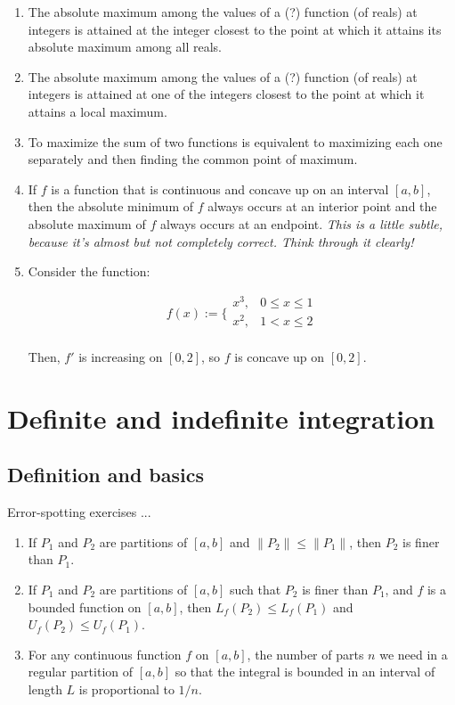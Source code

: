 \documentclass[10pt]{amsart}
\begin{document}
\begin{enumerate}
\item The absolute maximum among the values of a (?) function (of reals)
  at integers is attained at the integer closest to the point at which
  it attains its absolute maximum among all reals.
\item The absolute maximum among the values of a (?) function (of reals)
  at integers is attained at one of the integers closest to the point
  at which it attains a local maximum.
\item To maximize the sum of two functions is equivalent to maximizing
  each one separately and then finding the common point of maximum.
\item If $f$ is a function that is continuous and concave up on an
  interval $[a,b]$, then the absolute minimum of $f$ always occurs at
  an interior point and the absolute maximum of $f$ always occurs at
  an endpoint. {\em This is a little subtle, because it's almost but
  not completely correct. Think through it clearly!}
\item Consider the function:

  $$f(x) := \lbrace\begin{array}{rl} x^3, & 0 \le x \le 1 \\ x^2, & 1 < x \le 2 \\\end{array}$$

  Then, $f'$ is increasing on $[0,2]$, so $f$ is concave up on
  $[0,2]$.
\end{enumerate}

\section{Definite and indefinite integration}

\subsection{Definition and basics}

Error-spotting exercises ...

\begin{enumerate}
\item If $P_1$ and $P_2$ are partitions of $[a,b]$ and $\| P_2 \| \le
  \| P_1 \|$, then $P_2$ is finer than $P_1$.
\item If $P_1$ and $P_2$ are partitions of $[a,b]$ such that $P_2$ is
  finer than $P_1$, and $f$ is a bounded function on $[a,b]$, then
  $L_f(P_2) \le L_f(P_1)$ and $U_f(P_2) \le U_f(P_1)$.
\item For any continuous function $f$ on $[a,b]$, the number of parts
  $n$ we need in a regular partition of $[a,b]$ so that the integral
  is bounded in an interval of length $L$ is proportional to $1/n$.
\end{enumerate}
\end{document}
